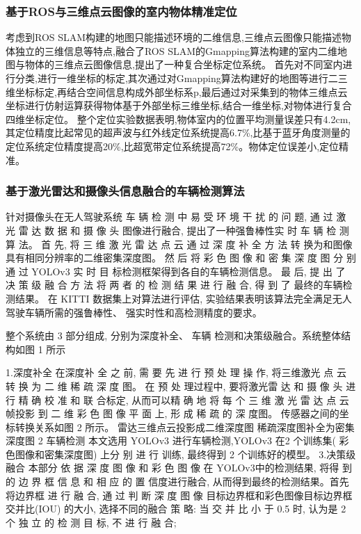 \documentclass{amsart}
\begin{document}
\subsubsection{基于ROS与三维点云图像的室内物体精准定位}
考虑到ROS SLAM构建的地图只能描述环境的二维信息,三维点云图像只能描述物体独立的三维信息等特点,\cite{于洋}融合了ROS SLAM的Gmapping算法构建的室内二维地图与物体的三维点云图像信息,提出了一种复合坐标定位系统。
首先对不同室内进行分类,进行一维坐标的标定,其次通过对Gmapping算法构建好的地图等进行二三维坐标标定,再结合空间信息构成外部坐标系p,最后通过对采集到的物体三维点云坐标进行仿射运算获得物体基于外部坐标三维坐标,结合一维坐标,对物体进行复合四维坐标定位。
整个定位实验数据表明,物体室内的位置平均测量误差只有4.2cm,其定位精度比起常见的超声波与红外线定位系统提高6.7\%,比基于蓝牙角度测量的定位系统定位精度提高20\%,比超宽带定位系统提高72\%。物体定位误差小,定位精准。

\subsubsection{基于激光雷达和摄像头信息融合的车辆检测算法}
针对摄像头在无人驾驶系统 车 辆 检 测 中 易 受 环 境 干 扰 的 问 题, 通 过 激 光 雷 达 数 据 和 摄 像 头 图像进行融合, 提出了一种强鲁棒性实 时 车 辆 检 测 算 法。
首 先, 将 三 维 激 光 雷 达 点 云 通 过 深 度 补 全 方 法 转 换为和图像具有相同分辨率的二维密集深度图。
然 后 将 彩 色 图 像 和 密 集 深 度 图 分 别 通 过 YOLOv3 实 时 目 标检测框架得到各自的车辆检测信息。
最 后, 提 出 了 决 策 级 融 合 方 法 将 两 者 的 检 测 结 果 进 行 融 合, 得 到 了 最终的车辆检测结果。
在 KITTI 数据集上对算法进行评估, 实验结果表明该算法完全满足无人驾驶车辆所需的强鲁棒性、 强实时性和高检测精度的要求。

整个系统由 3 部分组成, 分别为深度补全、 车辆
检测和决策级融合。系统整体结构如图 1 所示

1.深度补全
在深度补 全 之 前, 需 要 先 进 行 预 处 理 操 作, 将三维激光 点 云 转 换 为 二 维 稀 疏 深 度 图。
在 预 处 理过程中, 要将激光雷 达 和 摄 像 头 进 行 精 确 校 准 和 联
合标定, 从而可以精 确 地 将 每 个 三 维 激 光 雷 达 点 云帧投影 到 二 维 彩 色 图 像 平 面 上, 形 成 稀 疏 的 深 度图。
传感器之间的坐标转换关系如图 2 所示。
雷达三维点云投影成二维深度图
稀疏深度图补全为密集深度图
2 车辆检测
本文选用 YOLOv3 进行车辆检测,YOLOv3 在2 个训练集( 彩色图像和密集深度图) 上分 别 进 行 训练, 最终得到 2 个训练好的模型。
3.决策级融合
本部分 依 据 深 度 图 像 和 彩 色 图 像 在 YOLOv3中的检测结果, 将得 到 的 边 界 框 信 息 和 相 应 的 置 信度进行融合, 从而得到最终的检测结果。首先将边界框 进 行 融 合, 通 过 判 断 深 度 图 像 目标边界框和彩色图像目标边界框交并比(IOU) 的大小, 选择不同的融合 策 略: 当 交 并 比 小 于 0.5 时, 认为是 2 个 独 立 的 检 测 目 标, 不 进 行 融 合;
\end{document}
